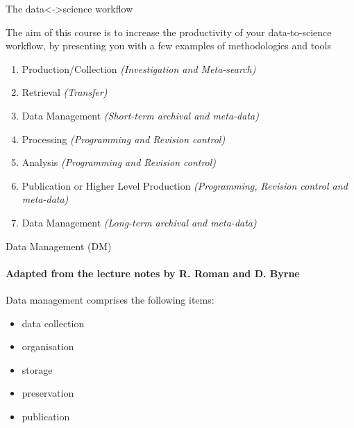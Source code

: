 \documentclass[english,aspectratio=169]{beamer}
\begin{document}
\begin{frame}{The data<->science workflow}

The aim of this course is to increase the productivity of your data-to-science workflow, by presenting you with a few examples of methodologies and tools
\begin{enumerate}
\item Production/Collection \emph{(Investigation and Meta-search)}
\item Retrieval \emph{(Transfer)}
\item Data Management \emph{(Short-term archival and meta-data)}
\item Processing \emph{(Programming and Revision control)}
\item Analysis \emph{(Programming and Revision control)}
\item Publication or Higher Level Production \emph{(Programming, Revision
control and meta-data)}
\item Data Management \emph{(Long-term archival and meta-data)}
\end{enumerate}
\end{frame}

\begin{frame}{Data Management (DM)}

\framesubtitle{Adapted from the lecture notes by R. Roman and D. Byrne}

Data management comprises the following items:
\begin{itemize}
\item data collection
\item organisation
\item storage
\item preservation
\item publication
\end{itemize}
\end{frame}
\end{document}
